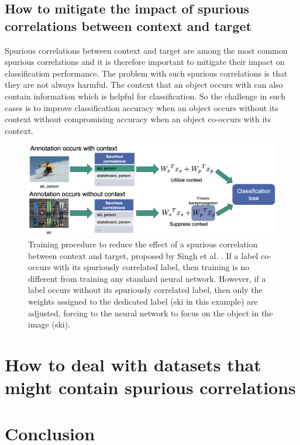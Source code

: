 \documentclass{article}
\begin{document}
\subsection{How to mitigate the impact of spurious correlations between context and target}
Spurious correlations between context and target are among the most common spurious correlations and it is therefore important to mitigate their impact on classification performance. The problem with such spurious correlations is that they are not always harmful. The context that an object occurs with can also contain information which is helpful for classification. So the challenge in such cases is to improve classification accuracy when an object occurs without its context without compromising accuracy when an object co-occurs with its context.
\begin{figure}
    \centering
    \includegraphics[scale=0.44]{context_suppression.png}
    \caption{Training procedure to reduce the effect of a spurious correlation between context and target, proposed by Singh et al. \cite{Singh_2020_CVPR}. If a label co-occurs with its spuriously correlated label, then training is no different from training any standard neural network. However, if a label occurs without its spuriously correlated label, then only the weights assigned to the dedicated label (ski in this example) are adjusted, forcing to the neural network to focus on the object in the image (ski).}
    \label{fig:contextSupprImg}
\end{figure}

\section{How to deal with datasets that might contain spurious correlations}

\section{Conclusion}

\printbibliography
\end{document}
